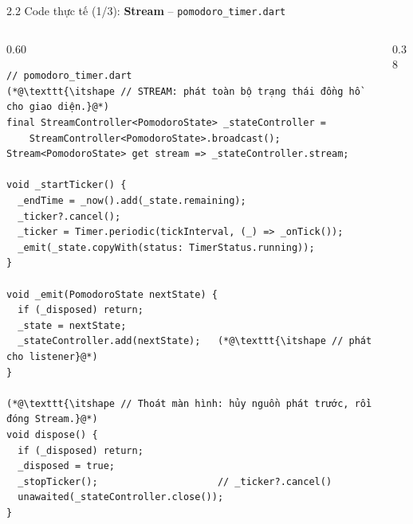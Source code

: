 \documentclass[aspectratio=169,10pt]{beamer}
\newcommand{\api}[1]{\texttt{\bfseries #1}}   %
\begin{document}
\begin{frame}[fragile]{2.2 Code thực tế (1/3): \textbf{Stream} -- \texttt{pomodoro\_timer.dart}}
  \begin{columns}[T]
    \begin{column}{0.60\textwidth}
\begin{lstlisting}[basicstyle=\ttfamily\fontsize{6.4}{7.4}\selectfont]
// pomodoro_timer.dart
(*@\texttt{\itshape // STREAM: phát toàn bộ trạng thái đồng hồ cho giao diện.}@*)
final StreamController<PomodoroState> _stateController =
    StreamController<PomodoroState>.broadcast();
Stream<PomodoroState> get stream => _stateController.stream;

void _startTicker() {
  _endTime = _now().add(_state.remaining);
  _ticker?.cancel();
  _ticker = Timer.periodic(tickInterval, (_) => _onTick());
  _emit(_state.copyWith(status: TimerStatus.running));
}

void _emit(PomodoroState nextState) {
  if (_disposed) return;
  _state = nextState;
  _stateController.add(nextState);   (*@\texttt{\itshape // phát cho listener}@*)
}

(*@\texttt{\itshape // Thoát màn hình: hủy nguồn phát trước, rồi đóng Stream.}@*)
void dispose() {
  if (_disposed) return;
  _disposed = true;
  _stopTicker();                     // _ticker?.cancel()
  unawaited(_stateController.close());
}
\end{lstlisting}
    \end{column}
    \begin{column}{0.38\textwidth}
      \footnotesize
    \end{column}
  \end{columns}
\end{frame}
\end{document}
